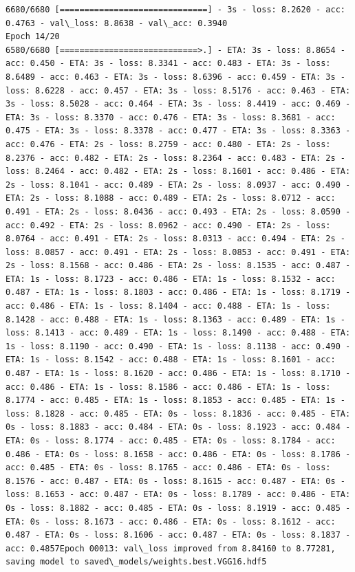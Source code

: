 \documentclass[11pt]{article}
\begin{document}
\begin{Verbatim}[commandchars=\\\{\}]
6680/6680 [==============================] - 3s - loss: 8.2620 - acc: 0.4763 - val\_loss: 8.8638 - val\_acc: 0.3940
Epoch 14/20
6580/6680 [============================>.] - ETA: 3s - loss: 8.8654 - acc: 0.450 - ETA: 3s - loss: 8.3341 - acc: 0.483 - ETA: 3s - loss: 8.6489 - acc: 0.463 - ETA: 3s - loss: 8.6396 - acc: 0.459 - ETA: 3s - loss: 8.6228 - acc: 0.457 - ETA: 3s - loss: 8.5176 - acc: 0.463 - ETA: 3s - loss: 8.5028 - acc: 0.464 - ETA: 3s - loss: 8.4419 - acc: 0.469 - ETA: 3s - loss: 8.3370 - acc: 0.476 - ETA: 3s - loss: 8.3681 - acc: 0.475 - ETA: 3s - loss: 8.3378 - acc: 0.477 - ETA: 3s - loss: 8.3363 - acc: 0.476 - ETA: 2s - loss: 8.2759 - acc: 0.480 - ETA: 2s - loss: 8.2376 - acc: 0.482 - ETA: 2s - loss: 8.2364 - acc: 0.483 - ETA: 2s - loss: 8.2464 - acc: 0.482 - ETA: 2s - loss: 8.1601 - acc: 0.486 - ETA: 2s - loss: 8.1041 - acc: 0.489 - ETA: 2s - loss: 8.0937 - acc: 0.490 - ETA: 2s - loss: 8.1088 - acc: 0.489 - ETA: 2s - loss: 8.0712 - acc: 0.491 - ETA: 2s - loss: 8.0436 - acc: 0.493 - ETA: 2s - loss: 8.0590 - acc: 0.492 - ETA: 2s - loss: 8.0962 - acc: 0.490 - ETA: 2s - loss: 8.0764 - acc: 0.491 - ETA: 2s - loss: 8.0313 - acc: 0.494 - ETA: 2s - loss: 8.0857 - acc: 0.491 - ETA: 2s - loss: 8.0853 - acc: 0.491 - ETA: 2s - loss: 8.1568 - acc: 0.486 - ETA: 2s - loss: 8.1535 - acc: 0.487 - ETA: 1s - loss: 8.1723 - acc: 0.486 - ETA: 1s - loss: 8.1532 - acc: 0.487 - ETA: 1s - loss: 8.1803 - acc: 0.486 - ETA: 1s - loss: 8.1719 - acc: 0.486 - ETA: 1s - loss: 8.1404 - acc: 0.488 - ETA: 1s - loss: 8.1428 - acc: 0.488 - ETA: 1s - loss: 8.1363 - acc: 0.489 - ETA: 1s - loss: 8.1413 - acc: 0.489 - ETA: 1s - loss: 8.1490 - acc: 0.488 - ETA: 1s - loss: 8.1190 - acc: 0.490 - ETA: 1s - loss: 8.1138 - acc: 0.490 - ETA: 1s - loss: 8.1542 - acc: 0.488 - ETA: 1s - loss: 8.1601 - acc: 0.487 - ETA: 1s - loss: 8.1620 - acc: 0.486 - ETA: 1s - loss: 8.1710 - acc: 0.486 - ETA: 1s - loss: 8.1586 - acc: 0.486 - ETA: 1s - loss: 8.1774 - acc: 0.485 - ETA: 1s - loss: 8.1853 - acc: 0.485 - ETA: 1s - loss: 8.1828 - acc: 0.485 - ETA: 0s - loss: 8.1836 - acc: 0.485 - ETA: 0s - loss: 8.1883 - acc: 0.484 - ETA: 0s - loss: 8.1923 - acc: 0.484 - ETA: 0s - loss: 8.1774 - acc: 0.485 - ETA: 0s - loss: 8.1784 - acc: 0.486 - ETA: 0s - loss: 8.1658 - acc: 0.486 - ETA: 0s - loss: 8.1786 - acc: 0.485 - ETA: 0s - loss: 8.1765 - acc: 0.486 - ETA: 0s - loss: 8.1576 - acc: 0.487 - ETA: 0s - loss: 8.1615 - acc: 0.487 - ETA: 0s - loss: 8.1653 - acc: 0.487 - ETA: 0s - loss: 8.1789 - acc: 0.486 - ETA: 0s - loss: 8.1882 - acc: 0.485 - ETA: 0s - loss: 8.1919 - acc: 0.485 - ETA: 0s - loss: 8.1673 - acc: 0.486 - ETA: 0s - loss: 8.1612 - acc: 0.487 - ETA: 0s - loss: 8.1606 - acc: 0.487 - ETA: 0s - loss: 8.1837 - acc: 0.4857Epoch 00013: val\_loss improved from 8.84160 to 8.77281, saving model to saved\_models/weights.best.VGG16.hdf5

\end{Verbatim}
\end{document}
